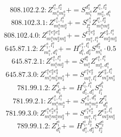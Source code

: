 \documentclass[letterpaper,10pt,fleqn,leqno,onecolumn]{article}
\begin{document}
\begin{equation} \;\;\;\;\;\;  808.102.2.2: Z^{l_{1}^{a},l_{2}^{a}}_{m_{1}^{a}m_{2}^{a}}+=S^{d_{1}^{a}}_{m_{1}^{a}}Z^{l_{1}^{a},l_{2}^{a}}_{m_{2}^{a},d_{1}^{a}} \end{equation}
\begin{equation} \;\;\;\;\;\;  808.102.3.1: Z^{e_{1}^{a},l_{1}^{a}}_{m_{1}^{a}m_{2}^{a}}+=S^{e_{1}^{a}}_{l_{2}^{a}}Z^{l_{1}^{a},l_{2}^{a}}_{m_{1}^{a}m_{2}^{a}} \end{equation}
\begin{equation} \;\;\;\;\;\;  808.102.4.0: Z^{e_{1}^{a}e_{2}^{a}e_{3}^{a}}_{m_{1}^{a}m_{2}^{a}m_{3}^{a}}+=S^{e_{1}^{a}e_{2}^{a}}_{m_{1}^{a},l_{1}^{a}}Z^{e_{3}^{a},l_{1}^{a}}_{m_{2}^{a}m_{3}^{a}} \end{equation}
\begin{equation} \;\;\;\;\;\;  645.87.1.2: Z^{e_{1}^{a},l_{1}^{a}}_{m_{1}^{a},d_{1}^{a}}+=H^{e_{1}^{a},l_{1}^{a}}_{d_{1}^{a},d_{2}^{a}}S^{d_{2}^{a}}_{m_{1}^{a}}\cdot 0.5 \end{equation}
\begin{equation} \;\;\;\;\;\;  645.87.2.1: Z^{e_{1}^{a},l_{1}^{a}}_{m_{1}^{a}m_{2}^{a}}+=S^{d_{1}^{a}}_{m_{1}^{a}}Z^{e_{1}^{a},l_{1}^{a}}_{m_{2}^{a},d_{1}^{a}} \end{equation}
\begin{equation} \;\;\;\;\;\;  645.87.3.0: Z^{e_{1}^{a}e_{2}^{a}e_{3}^{a}}_{m_{1}^{a}m_{2}^{a}m_{3}^{a}}+=S^{e_{1}^{a}e_{2}^{a}}_{m_{1}^{a},l_{1}^{a}}Z^{e_{3}^{a},l_{1}^{a}}_{m_{2}^{a}m_{3}^{a}} \end{equation}
\begin{equation} \;\;\;\;\;\;  781.99.1.2: Z^{l_{1}^{a}}_{d_{1}^{a}}+=H^{l_{1}^{b},l_{1}^{a}}_{d_{1}^{b},d_{1}^{a}}S^{d_{1}^{b}}_{l_{1}^{b}} \end{equation}
\begin{equation} \;\;\;\;\;\;  781.99.2.1: Z^{e_{1}^{a},l_{1}^{a}}_{m_{1}^{a}m_{2}^{a}}+=S^{e_{1}^{a},d_{1}^{a}}_{m_{1}^{a}m_{2}^{a}}Z^{l_{1}^{a}}_{d_{1}^{a}} \end{equation}
\begin{equation} \;\;\;\;\;\;  781.99.3.0: Z^{e_{1}^{a}e_{2}^{a}e_{3}^{a}}_{m_{1}^{a}m_{2}^{a}m_{3}^{a}}+=S^{e_{1}^{a}e_{2}^{a}}_{m_{1}^{a},l_{1}^{a}}Z^{e_{3}^{a},l_{1}^{a}}_{m_{2}^{a}m_{3}^{a}} \end{equation}
\begin{equation} \;\;\;\;\;\;  789.99.1.2: Z^{l_{1}^{a}}_{d_{1}^{a}}+=H^{l_{1}^{a},l_{2}^{a}}_{d_{1}^{a},d_{2}^{a}}S^{d_{2}^{a}}_{l_{2}^{a}} \end{equation}
\end{document}
